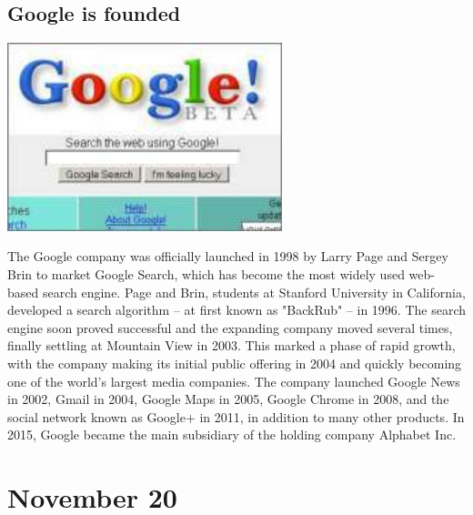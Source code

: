 \documentclass[11pt]{report}
\begin{document}
\subsection{Google is founded}
\vspace{2mm}\begin{center}\includegraphics[width=8cm]{./img/googlebeta.jpg}\end{center}
The Google company was officially launched in 1998 by Larry Page and Sergey Brin to market Google Search, which has become the most widely used web-based search engine. Page and Brin, students at Stanford University in California, developed a search algorithm – at first known as "BackRub" – in 1996. The search engine soon proved successful and the expanding company moved several times, finally settling at Mountain View in 2003. This marked a phase of rapid growth, with the company making its initial public offering in 2004 and quickly becoming one of the world's largest media companies. The company launched Google News in 2002, Gmail in 2004, Google Maps in 2005, Google Chrome in 2008, and the social network known as Google+ in 2011, in addition to many other products. In 2015, Google became the main subsidiary of the holding company Alphabet Inc.

\section{November 20}
\end{document}
